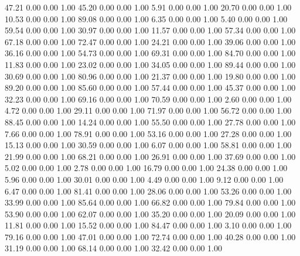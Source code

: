    47.21   0.00   0.00   1.00
   45.20   0.00   0.00   1.00
    5.91   0.00   0.00   1.00
   20.70   0.00   0.00   1.00
   10.53   0.00   0.00   1.00
   89.08   0.00   0.00   1.00
    6.35   0.00   0.00   1.00
    5.40   0.00   0.00   1.00
   59.54   0.00   0.00   1.00
   30.97   0.00   0.00   1.00
   11.57   0.00   0.00   1.00
   57.34   0.00   0.00   1.00
   67.18   0.00   0.00   1.00
   72.47   0.00   0.00   1.00
   24.21   0.00   0.00   1.00
   39.06   0.00   0.00   1.00
   36.16   0.00   0.00   1.00
   54.73   0.00   0.00   1.00
   69.31   0.00   0.00   1.00
   84.70   0.00   0.00   1.00
   11.83   0.00   0.00   1.00
   23.02   0.00   0.00   1.00
   34.05   0.00   0.00   1.00
   89.44   0.00   0.00   1.00
   30.69   0.00   0.00   1.00
   80.96   0.00   0.00   1.00
   21.37   0.00   0.00   1.00
   19.80   0.00   0.00   1.00
   89.20   0.00   0.00   1.00
   85.60   0.00   0.00   1.00
   57.44   0.00   0.00   1.00
   45.37   0.00   0.00   1.00
   32.23   0.00   0.00   1.00
   69.16   0.00   0.00   1.00
   70.59   0.00   0.00   1.00
    2.60   0.00   0.00   1.00
    4.72   0.00   0.00   1.00
   29.11   0.00   0.00   1.00
   71.97   0.00   0.00   1.00
   56.72   0.00   0.00   1.00
   88.45   0.00   0.00   1.00
   14.24   0.00   0.00   1.00
   55.50   0.00   0.00   1.00
   27.78   0.00   0.00   1.00
    7.66   0.00   0.00   1.00
   78.91   0.00   0.00   1.00
   53.16   0.00   0.00   1.00
   27.28   0.00   0.00   1.00
   15.13   0.00   0.00   1.00
   30.59   0.00   0.00   1.00
    6.07   0.00   0.00   1.00
   58.81   0.00   0.00   1.00
   21.99   0.00   0.00   1.00
   68.21   0.00   0.00   1.00
   26.91   0.00   0.00   1.00
   37.69   0.00   0.00   1.00
    5.02   0.00   0.00   1.00
    2.78   0.00   0.00   1.00
   16.79   0.00   0.00   1.00
   24.38   0.00   0.00   1.00
    5.96   0.00   0.00   1.00
   30.01   0.00   0.00   1.00
    4.49   0.00   0.00   1.00
    9.12   0.00   0.00   1.00
    6.47   0.00   0.00   1.00
   81.41   0.00   0.00   1.00
   28.06   0.00   0.00   1.00
   53.26   0.00   0.00   1.00
   33.99   0.00   0.00   1.00
   85.64   0.00   0.00   1.00
   66.82   0.00   0.00   1.00
   79.84   0.00   0.00   1.00
   53.90   0.00   0.00   1.00
   62.07   0.00   0.00   1.00
   35.20   0.00   0.00   1.00
   20.09   0.00   0.00   1.00
   11.81   0.00   0.00   1.00
   15.52   0.00   0.00   1.00
   84.47   0.00   0.00   1.00
    3.10   0.00   0.00   1.00
   79.16   0.00   0.00   1.00
   47.01   0.00   0.00   1.00
   72.74   0.00   0.00   1.00
   40.28   0.00   0.00   1.00
   31.19   0.00   0.00   1.00
   68.14   0.00   0.00   1.00
   32.42   0.00   0.00   1.00
